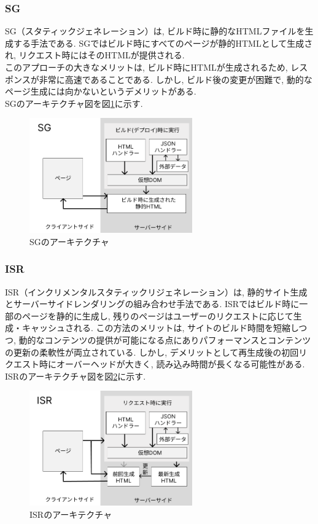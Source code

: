 \subsubsection{SG}
SG（スタティックジェネレーション）は, ビルド時に静的なHTMLファイルを生成する手法である. 
SGではビルド時にすべてのページが静的HTMLとして生成され, リクエスト時にはそのHTMLが提供される. \\
このアプローチの大きなメリットは, ビルド時にHTMLが生成されるため, レスポンスが非常に高速であることである. 
しかし, ビルド後の変更が困難で, 動的なページ生成には向かないというデメリットがある. \\
SGのアーキテクチャ図を図\ref{fig:SG-image}に示す. 

\begin{figure}[htbp]
	\begin{center}
		\includegraphics[width=70mm]{./images/SG.png}
		\caption{SGのアーキテクチャ}\label{fig:SG-image}
	\end{center}
\end{figure}

\subsubsection{ISR}
ISR（インクリメンタルスタティックリジェネレーション）は, 静的サイト生成とサーバーサイドレンダリングの組み合わせ手法である. 
ISRではビルド時に一部のページを静的に生成し, 残りのページはユーザーのリクエストに応じて生成・キャッシュされる. 
この方法のメリットは, サイトのビルド時間を短縮しつつ, 動的なコンテンツの提供が可能になる点にありパフォーマンスとコンテンツの更新の柔軟性が両立されている. 
しかし, デメリットとして再生成後の初回リクエスト時にオーバーヘッドが大きく, 読み込み時間が長くなる可能性がある. \\
ISRのアーキテクチャ図を図\ref{fig:ISR-image}に示す. 

\begin{figure}[htbp]
	\begin{center}
		\includegraphics[width=70mm]{./images/ISR.png}
		\caption{ISRのアーキテクチャ}\label{fig:ISR-image}
	\end{center}
\end{figure}

